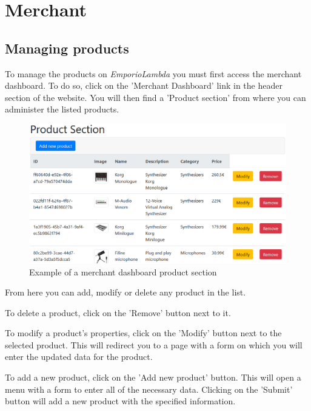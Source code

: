 \section{Merchant}

\subsection{Managing products}
To manage the products on \textit{EmporioLambda} you must first access the merchant dashboard. To do so, click on the 'Merchant Dashboard' link in the header section of the website. You will then find a 'Product section' from where you can administer the listed products.

\begin{figure}[H]
\centering
\includegraphics[scale=0.6]{res/Immagini/ProductSection}
\caption{Example of a merchant dashboard product section}
\end{figure}

From here you can add, modify or delete any product in the list.

To delete a product, click on the 'Remove' button next to it.

To modify a product's properties, click on the 'Modify' button next to the selected product. This will redirect you to a page with a form on which you will enter the updated data for the product. 

To add a new product, click on the 'Add new product' button. This will open a menu with a form to enter all of the necessary data. Clicking on the 'Submit' button will add a new product with the specified information.

